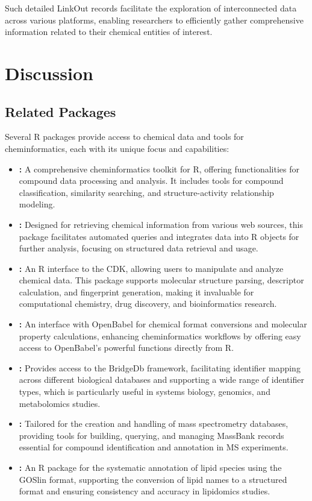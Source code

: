 Such detailed LinkOut records facilitate the exploration of interconnected data across various platforms, enabling researchers to efficiently gather comprehensive information related to their chemical entities of interest.

\hypertarget{discussion}{%
\section{Discussion}\label{discussion}}

\hypertarget{related-packages}{%
\subsection{Related Packages}\label{related-packages}}

Several R packages provide access to chemical data and tools for cheminformatics, each with its unique focus and capabilities:

\begin{itemize}
\item
  \textbf{:} A comprehensive cheminformatics toolkit for R, offering functionalities for compound data processing and analysis. It includes tools for compound classification, similarity searching, and structure-activity relationship modeling.
\item
  \textbf{:} Designed for retrieving chemical information from various web sources, this package facilitates automated queries and integrates data into R objects for further analysis, focusing on structured data retrieval and usage.
\item
  \textbf{:} An R interface to the CDK, allowing users to manipulate and analyze chemical data. This package supports molecular structure parsing, descriptor calculation, and fingerprint generation, making it invaluable for computational chemistry, drug discovery, and bioinformatics research.
\item
  \textbf{:} An interface with OpenBabel for chemical format conversions and molecular property calculations, enhancing cheminformatics workflows by offering easy access to OpenBabel's powerful functions directly from R.
\item
  \textbf{:} Provides access to the BridgeDb framework, facilitating identifier mapping across different biological databases and supporting a wide range of identifier types, which is particularly useful in systems biology, genomics, and metabolomics studies.
\item
  \textbf{:} Tailored for the creation and handling of mass spectrometry databases, providing tools for building, querying, and managing MassBank records essential for compound identification and annotation in MS experiments.
\item
  \textbf{:} An R package for the systematic annotation of lipid species using the GOSlin format, supporting the conversion of lipid names to a structured format and ensuring consistency and accuracy in lipidomics studies.
\end{itemize}


